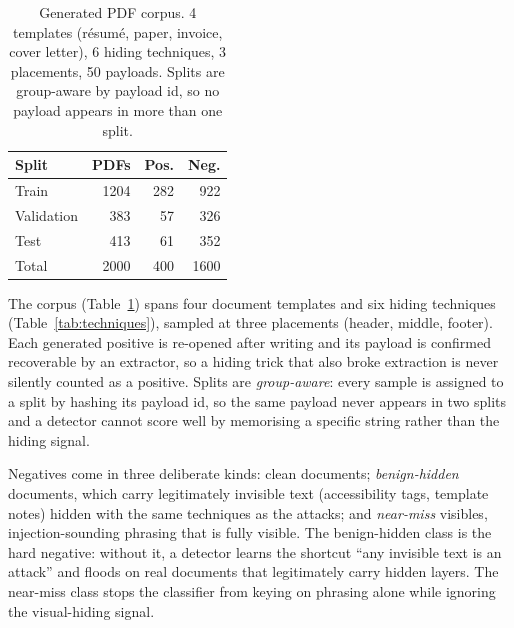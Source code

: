 \documentclass[11pt]{article}
\begin{document}
\begin{table}[t]
  \centering
  \small
  \begin{tabular}{lrrr}
    \toprule
    \textbf{Split} & \textbf{PDFs} & \textbf{Pos.} & \textbf{Neg.} \\
    \midrule
    Train & 1204 & 282 & 922 \\
    Validation & 383 & 57 & 326 \\
    Test  & 413 & 61 & 352 \\
    \midrule
    Total & 2000 & 400 & 1600 \\
    \bottomrule
  \end{tabular}
  \caption{Generated PDF corpus. 4 templates (r\'esum\'e, paper, invoice,
  cover letter), 6 hiding techniques, 3 placements, 50 payloads. Splits are
  group-aware by payload id, so no payload appears in more than one split.}
  \label{tab:corpus}
\end{table}

The corpus (Table~\ref{tab:corpus}) spans four document templates and six
hiding techniques (Table~\ref{tab:techniques}), sampled at three placements
(header, middle, footer). Each generated positive is re-opened after writing and
its payload is confirmed recoverable by an extractor, so a hiding trick that
also broke extraction is never silently counted as a positive. Splits are
\emph{group-aware}: every sample is assigned to a split by hashing its payload
id, so the same payload never appears in two splits and a detector cannot score
well by memorising a specific string rather than the hiding signal.

Negatives come in three deliberate kinds: clean documents; \emph{benign-hidden}
documents, which carry legitimately invisible text (accessibility tags, template
notes) hidden with the same techniques as the attacks; and \emph{near-miss}
visibles, injection-sounding phrasing that is fully visible. The benign-hidden
class is the hard negative: without it, a detector learns the shortcut ``any
invisible text is an attack'' and floods on real documents that legitimately
carry hidden layers. The near-miss class stops the classifier from keying on
phrasing alone while ignoring the visual-hiding signal.
\end{document}
